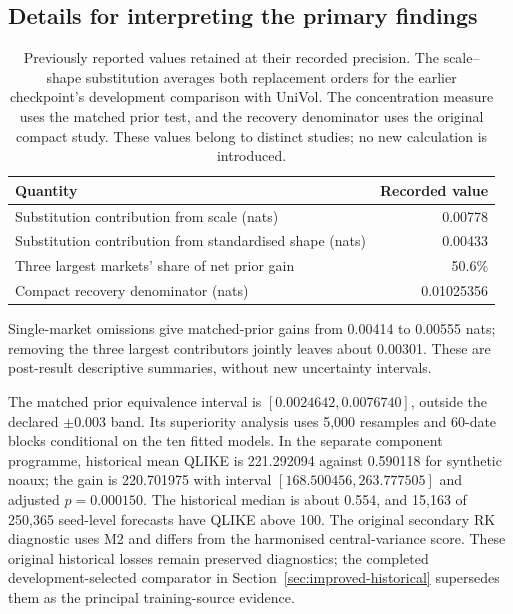 \subsection{Details for interpreting the primary findings}
\label{sec:prior-interpretation-details}

\begin{table}[H]
\centering\small
\caption[Recorded precision for values rounded in prose]{Previously reported values retained at their recorded precision. The scale--shape substitution averages both replacement orders for the earlier checkpoint's development comparison with UniVol. The concentration measure uses the matched prior test, and the recovery denominator uses the original compact study. These values belong to distinct studies; no new calculation is introduced.}
\label{tab:clarity-precision}
\begin{tabular}{lr}
\toprule
Quantity & Recorded value \\
\midrule
Substitution contribution from scale (nats) & 0.00778 \\
Substitution contribution from standardised shape (nats) & 0.00433 \\
Three largest markets' share of net prior gain & 50.6\% \\
Compact recovery denominator (nats) & 0.01025356 \\
\bottomrule
\end{tabular}
\end{table}

Single-market omissions give matched-prior gains from 0.00414 to 0.00555 nats; removing the three largest contributors jointly leaves about 0.00301. These are post-result descriptive summaries, without new uncertainty intervals.

The matched prior equivalence interval is $[0.0024642,0.0076740]$, outside the declared $\pm0.003$ band. Its superiority analysis uses 5,000 resamples and 60-date blocks conditional on the ten fitted models. In the separate component programme, historical mean QLIKE is 221.292094 against 0.590118 for synthetic noaux; the gain is 220.701975 with interval $[168.500456,263.777505]$ and adjusted $p=0.000150$. The historical median is about 0.554, and 15,163 of 250,365 seed-level forecasts have QLIKE above 100. The original secondary RK diagnostic uses M2 and differs from the harmonised central-variance score. These original historical losses remain preserved diagnostics; the completed development-selected comparator in Section~\ref{sec:improved-historical} supersedes them as the principal training-source evidence.

